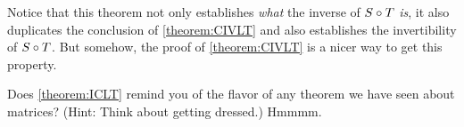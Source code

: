 \documentclass{ximera}
\begin{document}
Notice that this theorem not only establishes \textit{what} the inverse of ${S}\circ{T}$ \textit{is}, it also duplicates the conclusion of \ref{theorem:CIVLT} and also establishes the invertibility of ${S}\circ{T}$.  But somehow, the proof of \ref{theorem:CIVLT} is a nicer way to get this property.


Does \ref{theorem:ICLT} remind you of the flavor of any theorem we have seen about matrices?  (Hint:  Think about getting dressed.)  Hmmmm.
\end{document}
